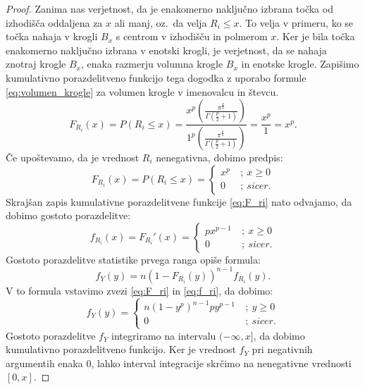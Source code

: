 \documentclass[12pt,a4paper,twoside]{article}
\theoremstyle{definition} %
\theoremstyle{plain} %
\numberwithin{equation}{section}  %
\begin{document}
\begin{proof}
	Zanima nas verjetnost, da je enakomerno naključno izbrana točka od izhodišča oddaljena za $x$ ali manj, oz.~da velja $R_i \leq x$.
	To velja v primeru, ko se točka nahaja v krogli $B_x$ s centrom v izhodišču in polmerom $x$.
	Ker je bila točka enakomerno naključno izbrana v enotski krogli, je verjetnost, da se nahaja znotraj krogle $B_x$, enaka razmerju volumna krogle $B_x$ in enotske krogle.
	Zapišimo kumulativno porazdelitveno funkcijo tega dogodka z uporabo formule \ref{eq:volumen_krogle} za volumen krogle v imenovalcu in števcu.
	\begin{equation*}
		F_{R_i}(x) = 
		P(R_i \leq x) = 
		\frac{x^p \left( \frac{\pi^{\frac{p}{2}}}{\Gamma (\frac{p}{2}+1)} \right)}{1^p \left( \frac{\pi^{\frac{p}{2}}}{\Gamma (\frac{p}{2}+1)} \right)} =
		\frac{x^p}{1} = x^p.
	\end{equation*}
	Če upoštevamo, da je vrednost $R_i$ nenegativna, dobimo predpis:
	\begin{equation}
	\label{eq:F_ri}
		F_{R_i}(x) = 
		P(R_i \leq x) = 
		\begin{cases}
			x^p\ &;\ x \geq 0 \\
			0\ &;\ sicer.
		\end{cases}
	\end{equation}
	Skrajšan zapis kumulativne porazdelitvene funkcije \ref{eq:F_ri} nato odvajamo, da dobimo gostoto porazdelitve:
	\begin{equation}
	\label{eq:f_ri}
		f_{R_i}(x) = 
		F_{R_i} '(x) =
		\begin{cases}
			p x^{p-1}\ &;\ x \geq 0 \\
			0\ &;\ sicer.
		\end{cases} 
	\end{equation}
	Gostoto porazdelitve statistike prvega ranga \cite[pogl.~4.6]{hogg2005introduction} opiše formula:
	\begin{equation*}
		f_Y(y) = n(1 - F_{R_i}(y))^{n-1} f_{R_i}(y).
	\end{equation*}
	V to formula vstavimo zvezi \ref{eq:F_ri} in \ref{eq:f_ri}, da dobimo:
	\begin{equation}
		f_Y(y) = 
		\begin{cases}
			n(1 - y^p)^{n-1} p y^{p-1}\ &;\ y \geq 0 \\
			0\ &;\ sicer.
		\end{cases} 
	\end{equation}
	Gostoto porazdelitve $f_Y$ integriramo na intervalu $(-\infty,x]$, da dobimo kumulativno porazdelitveno funkcijo.
	Ker je vrednost $f_Y$ pri negativnih argumentih enaka $0$, lahko interval integracije skrčimo na nenegativne vrednosti $[0,x]$.

\end{proof}
\end{document}
